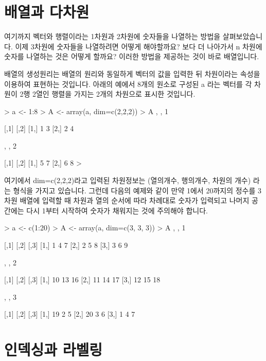 \documentclass{book}
\begin{document}
\section{배열과 다차원} 

여기까지 벡터와 행렬이라는 1차원과 2차원에 숫자들을 나열하는 방법을 살펴보았습니다.
이제 3차원에 숫자들을 나열하려면 어떻게 해야할까요? 
보다 더 나아가서 n 차원에 숫자를 나열하는 것은 어떻게 할까요?
이러한 방법을 제공하는 것이 바로 배열입니다. 

배열의 생성원리는 배열의 원리와 동일하게 벡터의 값을 입력한 뒤 차원이라는 속성을 이용하여 표현하는 것입니다.
아래의 예에서 8개의 원소로 구성된 a 라는 벡터를 각 차원이 2행 2열인 행렬을 가지는 2개의 차원으로 표시한 것입니다. 

\begin{Schunk}
\begin{Soutput}
> a <- 1:8
> A <- array(a, dim=c(2,2,2))
> A 
, , 1

     [,1] [,2]
[1,]    1    3
[2,]    2    4

, , 2

     [,1] [,2]
[1,]    5    7
[2,]    6    8
>
\end{Soutput}
\end{Schunk}

여기에서 dim=c(2,2,2)라고 입력된 차원정보는 (열의개수, 행의개수, 차원의 개수) 라는 형식을 가지고 있습니다. 
그런데 다음의 예제와 같이 만약 1에서 20까지의 정수를 3차원 배열에 입력할 때 차원과 열의 순서에 따라 차례대로 숫자가 입력되고 나머지 공간에는 다시 1부터 시작하여 숫자가 채워지는 것에 주의해야 합니다.

\begin{Schunk}
\begin{Soutput}

> a <- c(1:20)
> A <- array(a, dim=c(3, 3, 3))
> A
, , 1

     [,1] [,2] [,3]
[1,]    1    4    7
[2,]    2    5    8
[3,]    3    6    9

, , 2

     [,1] [,2] [,3]
[1,]   10   13   16
[2,]   11   14   17
[3,]   12   15   18

, , 3

     [,1] [,2] [,3]
[1,]   19    2    5
[2,]   20    3    6
[3,]    1    4    7
\end{Soutput}
\end{Schunk}

\section{인덱싱과 라벨링}
\end{document}
